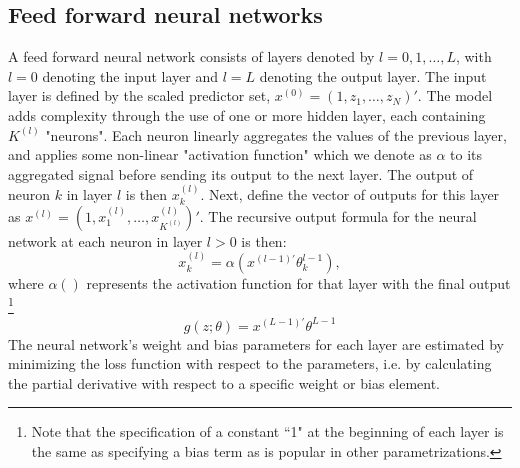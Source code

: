 \documentclass{article}
\begin{document}
\subsection{Feed forward neural networks}
A feed forward neural network consists of layers denoted by $l = 0, 1, \dots, L$, with $l = 0$ denoting the input layer and $l = L$ denoting the output layer. The input layer is defined by the scaled predictor set, $x^{(0)} = (1, z_1, \dots, z_N)'$. The model adds complexity through the use of one or more hidden layer, each containing $K^{(l)}$ "neurons". Each neuron linearly aggregates the values of the previous layer, and applies some non-linear "activation function" which we denote as $\alpha$ to its aggregated signal before sending its output to the next layer. The output of neuron $k$ in layer $l$ is then $x_k^{(l)}$. Next, define the vector of outputs for this layer as $x^{(l)} = (1, x_1^{(l)}, \dots, x_{K^(l)}^{(l)})'$.  The recursive output formula for the neural network at each neuron in layer $l > 0$ is then:
\begin{equation}
x_k^{(l)} = \alpha(x^{(l-1)'}\theta_k^{l-1}),
\end{equation}
where $\alpha()$ represents the activation function for that layer with the final output \footnote{Note that the specification of a constant ``1" at the beginning of each layer is the same as specifying a bias term as is popular in other parametrizations. }
\begin{equation}
g(z;\theta) = x^{(L-1)'}\theta^{L-1}
\end{equation}
The neural network's weight and bias parameters for each layer are estimated by minimizing the loss function with respect to the parameters, i.e. by calculating the partial derivative with respect to a specific weight or bias element. 
\end{document}
